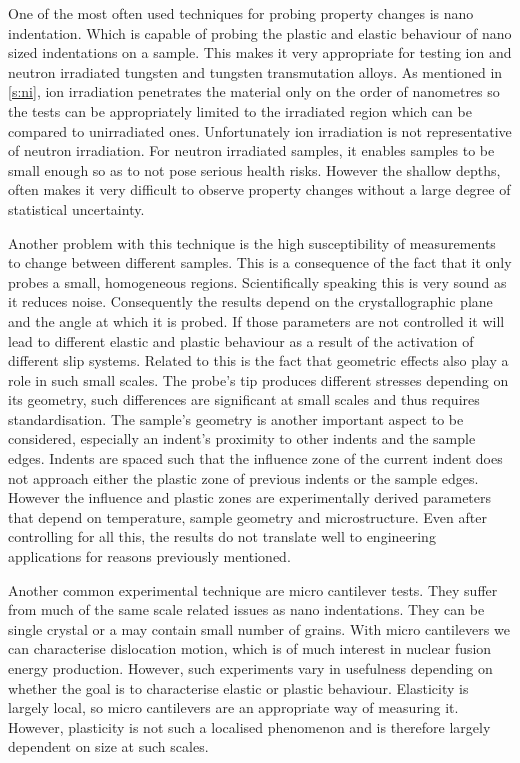 \documentclass[12pt, a4paper]{article}
\begin{document}
		One of the most often used techniques for probing property changes is nano indentation. Which is capable of probing the plastic and elastic behaviour of nano sized indentations on a sample. This makes it very appropriate for testing ion and neutron irradiated tungsten and tungsten transmutation alloys. As mentioned in \cref{s:ni}, ion irradiation penetrates the material only on the order of nanometres so the tests can be appropriately limited to the irradiated region which can be compared to unirradiated ones. Unfortunately ion irradiation is not representative of neutron irradiation. For neutron irradiated samples, it enables samples to be small enough so as to not pose serious health risks. However the shallow depths, often makes it very difficult to observe property changes without a large degree of statistical uncertainty.
		
		Another problem with this technique is the high susceptibility of measurements to change between different samples. This is a consequence of the fact that it only probes a small, homogeneous regions. Scientifically speaking this is very sound as it reduces noise. Consequently the results depend on the crystallographic plane and the angle at which it is probed. If those parameters are not controlled it will lead to different elastic and plastic behaviour as a result of the activation of different slip systems. Related to this is the fact that geometric effects also play a role in such small scales. The probe's tip produces different stresses depending on its geometry, such differences are significant at small scales and thus requires standardisation. The sample's geometry is another important aspect to be considered, especially an indent's proximity to other indents and the sample edges. Indents are spaced such that the influence zone of the current indent does not approach either the plastic zone of previous indents or the sample edges. However the influence and plastic zones are experimentally derived parameters that depend on temperature, sample geometry and microstructure. Even after controlling for all this, the results do not translate well to engineering applications for reasons previously mentioned.
		
		Another common experimental technique are micro cantilever tests. They suffer from much of the same scale related issues as nano indentations. They can be single crystal or a may contain small number of grains. With micro cantilevers we can characterise dislocation motion, which is of much interest in nuclear fusion energy production. However, such experiments vary in usefulness depending on whether the goal is to characterise elastic or plastic behaviour. Elasticity is largely local, so micro cantilevers are an appropriate way of measuring it. However, plasticity is not such a localised phenomenon and is therefore largely dependent on size at such scales.
				
\end{document}
